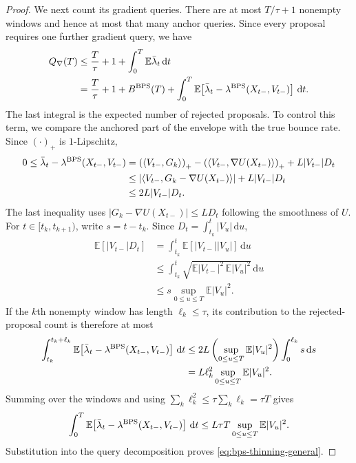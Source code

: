 \documentclass{amsart}
\theoremstyle{plain}
\theoremstyle{definition}
\theoremstyle{remark}
\newcommand{\ud}{\,\mathrm{d}}
\newcommand{\EE}{\mathbb{E}}
\newcommand{\abs}[1]{\lvert#1\rvert}
\newcommand{\E}{\EE}
\newcommand{\1}{\mathbf 1}
\newcommand{\dd}{\ud}
\newcommand{\ip}[2]{\langle #1,#2\rangle}
\newcommand{\pos}[1]{\left(#1\right)_+}
\newcommand{\bps}{{\rm BPS}}
\begin{document}
\begin{proof}
We next count its gradient queries.  There are at most $T/\tau+1$ nonempty
windows and hence at most that many anchor queries.  Since every proposal
requires one further gradient query, we have
\[
\begin{aligned}
        Q_\nabla(T)
        &\le\frac{T}{\tau}+1+\int_0^T\E\bar\lambda_t\dd t\\
        &=\frac{T}{\tau}+1+B^{\bps}(T)
          +\int_0^T\E\!\left[
            \bar\lambda_t-\lambda^{\bps}(X_{t-},V_{t-})
          \right]\dd t.
\end{aligned}
\]
The last integral is the expected number of rejected proposals.
To control this term, we compare the anchored part of the envelope with the
true bounce rate.  Since $\pos{\cdot}$ is $1$-Lipschitz,
\[
\begin{aligned}
        0\le{}
        \bar\lambda_t-\lambda^{\bps}(X_{t-},V_{t-})
        &=\pos{\ip{V_{t-}}{G_k}}
          -\pos{\ip{V_{t-}}{\nabla U(X_{t-})}}
          +L\abs{V_{t-}}D_t\\
        &\le
          \abs{\ip{V_{t-}}{G_k-\nabla U(X_{t-})}}
          +L\abs{V_{t-}}D_t\\
        &\le2L\abs{V_{t-}}D_t.
\end{aligned}
\]
The last inequality uses
$\abs{G_k-\nabla U(X_{t-})}\le L D_t$ following the smoothness of $U$.
For $t\in[t_k,t_{k+1})$, write $s=t-t_k$.  Since
$D_t=\int_{t_k}^t\abs{V_u}\dd u$,
\[
\begin{aligned}
        \E[\abs{V_{t-}}D_t]
        &=\int_{t_k}^t\E[\abs{V_{t-}}\abs{V_u}]\dd u\\
        &\le\int_{t_k}^t
          \sqrt{\E\abs{V_{t-}}^2\,\E\abs{V_u}^2}\dd u\\
        &\le s\sup_{0\le u\le T}\E\abs{V_u}^2.
\end{aligned}
\]
If the $k$th nonempty window has length $\ell_k\le\tau$, its contribution to
the rejected-proposal count is therefore at most
\[
\begin{aligned}
        \int_{t_k}^{t_k+\ell_k}
        \E\!\left[
          \bar\lambda_t-\lambda^{\bps}(X_{t-},V_{t-})
        \right]\dd t
        &\le2L\left(\sup_{0\le u\le T}\E\abs{V_u}^2\right)
          \int_0^{\ell_k}s\dd s\\
        &=L\ell_k^2
          \sup_{0\le u\le T}\E\abs{V_u}^2.
\end{aligned}
\]
Summing over the windows and using
$\sum_k\ell_k^2\le\tau\sum_k\ell_k=\tau T$ gives
\[
        \int_0^T\E\!\left[
          \bar\lambda_t-\lambda^{\bps}(X_{t-},V_{t-})
        \right]\dd t
        \le L\tau T\sup_{0\le u\le T}\E\abs{V_u}^2.
\]
Substitution into the query decomposition proves
\eqref{eq:bps-thinning-general}.


\end{proof}
\end{document}
